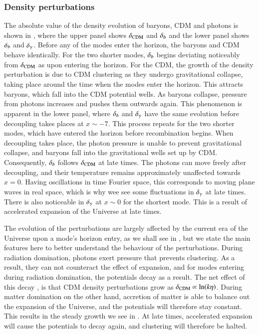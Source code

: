 \subsubsection{Density perturbations} \label{sssec:M3:results:density_perturbations}
The absolute value of the density evolution of baryons, CDM and photons is shown in , where the upper panel shows $\delta_\mathrm{CDM}$ and $\delta_b$ and the lower panel shows $\delta_b$ and $\delta_\gamma$. Before any of the modes enter the horizon, the baryons and CDM behave identically. For the two shorter modes, $\delta_b$ begins deviating noticeably from $\delta_\mathrm{CDM}$ as upon entering the horizon. For the CDM, the growth of the density perturbation is due to CDM clustering as they undergo gravitational collapse, taking place around the time when the modes enter the horizon. This attracts baryons, which fall into the CDM potential wells. As baryons collapse, pressure from photons increases and pushes them outwards again. This phenomenon is apparent in the lower panel, where $\delta_b$ and $\delta_\gamma$ have the same evolution before decoupling takes places at $x\sim-7$. This process repeats for the two shorter modes, which have entered the horizon before recombination begins. When decoupling takes place, the photon pressure is unable to prevent gravitational collapse, and baryons fall into the gravitational wells set up by CDM. Consequently, $\delta_b$ follows $\delta_\mathrm{CDM}$ at late times. The photons can move freely after decoupling, and their temperature remains approximately unaffected towards $x=0$. Having oscillations in time Fourier space, this corresponds to moving plane waves in real space, which is why wee see some fluctuations in $\delta_\gamma$ at late times. There is also noticeable in $\delta_\gamma$ at $x\sim0$ for the shortest mode. This is a result of accelerated expansion of the Universe at late times. 

The evolution of the perturbations are largely affected by the current era of the Universe upon a mode's horizon entry, as we shall see in , but we state the main features here to better understand the behaviour of the perturbations. During radiation domination, photons exert pressure that prevents clustering. As a result, they can not counteract the effect of expansion, and for modes entering during radiation domination, the potentials decay as a result. The net effect of this decay \cite[Eq. (8.52)]{Dodelson}, is that CDM density perturbations grow as $\delta_\mathrm{CDM}\propto\ln(k\eta)$. During matter domination on the other hand, accretion of matter is able to balance out the expansion of the Universe, and the potentials will therefore stay constant. This results in the steady growth we see in . At late times, accelerated expansion will cause the potentials to decay again, and clustering will therefore be halted.      

